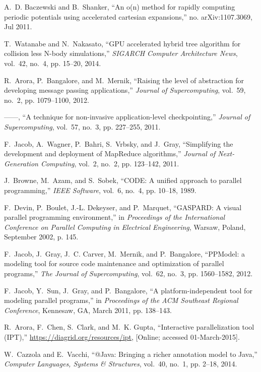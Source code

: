 \documentclass[draftclsnofoot]{elsarticle}
\begin{document}
\begin{thebibliography}{10}
A.~D. Baczewski and B.~Shanker, ``An o(n) method for rapidly computing periodic
  potentials using accelerated cartesian expansions,'' no. arXiv:1107.3069, Jul
  2011.

T.~Watanabe and N.~Nakasato, ``{GPU} accelerated hybrid tree algorithm for
  collision less {N}-body simulations,'' \emph{SIGARCH Computer Architecture
  News}, vol.~42, no.~4, pp. 15--20, 2014.

R.~Arora, P.~Bangalore, and M.~Mernik, ``Raising the level of abstraction for
  developing message passing applications,'' \emph{Journal of Supercomputing},
  vol.~59, no.~2, pp. 1079--1100, 2012.

------, ``A technique for non-invasive application-level checkpointing,''
  \emph{Journal of Supercomputing}, vol.~57, no.~3, pp. 227--255, 2011.

F.~Jacob, A.~Wagner, P.~Bahri, S.~Vrbsky, and J.~Gray, ``Simplifying the
  development and deployment of {M}ap{R}educe algorithms,'' \emph{Journal of
  Next-Generation Computing}, vol.~2, no.~2, pp. 123--142, 2011.

J.~Browne, M.~Azam, and S.~Sobek, ``{CODE}: {A} unified approach to parallel
  programming,'' \emph{IEEE Software}, vol.~6, no.~4, pp. 10--18, 1989.

F.~Devin, P.~Boulet, J.-L. Dekeyser, and P.~Marquet, ``{GASPARD}: {A} visual
  parallel programming environment,'' in \emph{Proceedings of the International
  Conference on Parallel Computing in Electrical Engineering}, Warsaw, Poland,
  September 2002, p. 145.

F.~Jacob, J.~Gray, J.~C. Carver, M.~Mernik, and P.~Bangalore, ``{PPModel}: a
  modeling tool for source code maintenance and optimization of parallel
  programs,'' \emph{The Journal of Supercomputing}, vol.~62, no.~3, pp.
  1560--1582, 2012.

F.~Jacob, Y.~Sun, J.~Gray, and P.~Bangalore, ``A platform-independent tool for
  modeling parallel programs,'' in \emph{Proceedings of the ACM Southeast
  Regional Conference}, Kennesaw, GA, March 2011, pp. 138--143.

R.~Arora, F.~Chen, S.~Clark, and M.~K. Gupta, ``Interactive parallelization
  tool (IPT),'' \url{https://diagrid.org/resources/ipt}, [Online; accessed
  01-March-2015].

W.~Cazzola and E.~Vacchi, ``@Java: Bringing a richer annotation model to Java,''
  \emph{Computer Languages, Systems \& Structures}, vol.~40, no.~1, pp.
  2--18, 2014.

\end{thebibliography}
\end{document}
